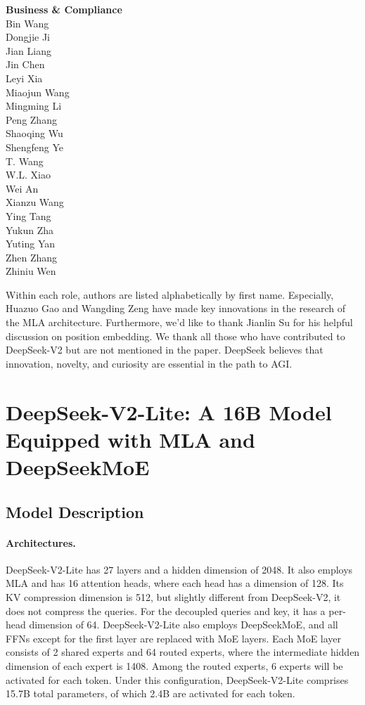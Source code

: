 \documentclass[11pt, a4paper, logo, copyright, nonumbering]{deepseek}
\newcommand{\dsvii}{DeepSeek-V2}
\newcommand{\dsviilite}{DeepSeek-V2-Lite}
\newcommand{\dsmoe}{DeepSeekMoE}
\begin{document}
\begin{CJK*}{UTF8}{gbsn}
\begin{multicols}{2}
\noindent
\textbf{Business \& Compliance} \\
Bin Wang  \\
Dongjie Ji  \\
Jian Liang  \\
Jin Chen  \\
Leyi Xia  \\
Miaojun Wang  \\
Mingming Li  \\
Peng Zhang  \\
Shaoqing Wu  \\
Shengfeng Ye  \\
T. Wang  \\
W.L. Xiao  \\
Wei An  \\
Xianzu Wang  \\
Ying Tang  \\
Yukun Zha  \\
Yuting Yan  \\
Zhen Zhang  \\
Zhiniu Wen  \\

\end{multicols} %

Within each role, authors are listed alphabetically by first name.
Especially, Huazuo Gao and Wangding Zeng have made key innovations in the research of the MLA architecture.
Furthermore, we'd like to thank Jianlin Su for his helpful discussion on position embedding.
We thank all those who have contributed to DeepSeek-V2 but are not mentioned in the paper.
DeepSeek believes that innovation, novelty, and curiosity are essential in the path to AGI.

\newpage

\section{\dsviilite{}: A 16B Model Equipped with MLA and DeepSeekMoE}
\label{app:dsviilite}

\subsection{Model Description}

\paragraph{Architectures.}
\dsviilite{} has 27 layers and a hidden dimension of 2048.
It also employs MLA and has 16 attention heads, where each head has a dimension of 128.
Its KV compression dimension is 512, but slightly different from \dsvii{}, it does not compress the queries. 
For the decoupled queries and key, it has a per-head dimension of 64. 
\dsviilite{} also employs \dsmoe{}, and all FFNs except for the first layer are replaced with MoE layers. 
Each MoE layer consists of 2 shared experts and 64 routed experts, where the intermediate hidden dimension of each expert is 1408. 
Among the routed experts, 6 experts will be activated for each token. 
Under this configuration, \dsviilite{} comprises 15.7B total parameters, of which 2.4B are activated for each token. 


\end{CJK*}
\end{document}
